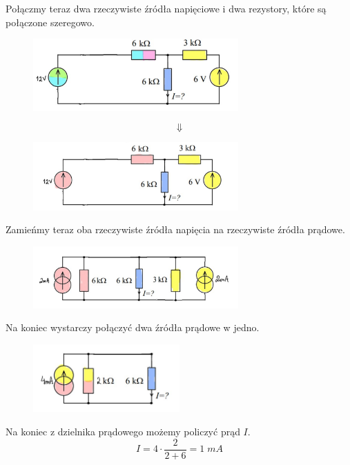 \documentclass[12pt, a4paper]{article}
\begin{document}
Połączmy teraz dwa rzeczywiste źródła napięciowe i dwa rezystory, które są
połączone szeregowo.
\begin{figure}[H]
  \centering
  \includegraphics[width = 0.7\textwidth]{./images/Lista_1/Zadanie5_3.png}
\end{figure}
$$
  \Downarrow
$$
\begin{figure}[H]
  \centering
  \includegraphics[width = 0.7\textwidth]{./images/Lista_1/Zadanie5_4.png}
\end{figure}

Zamieńmy teraz oba rzeczywiste źródła napięcia na rzeczywiste źródła prądowe.
\begin{figure}[H]
  \centering
  \includegraphics[width = 0.7\textwidth]{./images/Lista_1/Zadanie5_5.png}
\end{figure}

Na koniec wystarczy połączyć dwa źródła prądowe w jedno.
\begin{figure}[H]
  \centering
  \includegraphics[width = 0.5\textwidth]{./images/Lista_1/Zadanie5_6.png}
\end{figure}

Na koniec z dzielnika prądowego możemy policzyć prąd $I$.
$$
  I = 4 \cdot \frac{2}{2+6} = 1\; mA
$$
\end{document}

